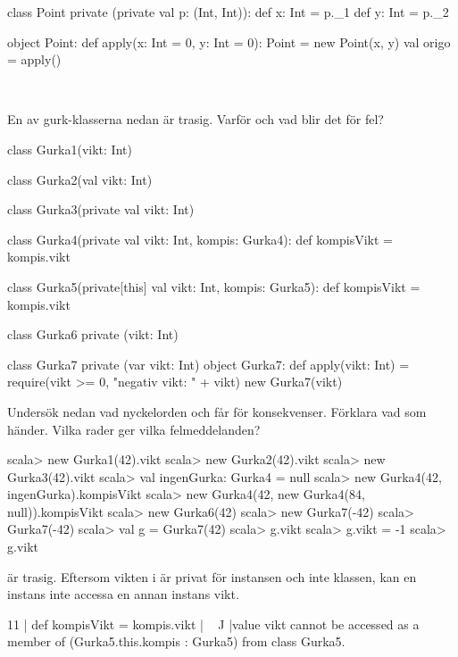 \SubtaskSolved

\begin{Code}
class Point private (private val p: (Int, Int)):
  def x: Int = p._1
  def y: Int = p._2

object Point:
  def apply(x: Int = 0, y: Int = 0): Point = new Point(x, y)
  val origo = apply()
\end{Code}

\QUESTEND




\QUESTBEGIN

\Task  \what~

\Subtask En av gurk-klasserna nedan är trasig. Varför och vad blir det för fel?

\begin{Code}
class Gurka1(vikt: Int)

class Gurka2(val vikt: Int)

class Gurka3(private val vikt: Int)

class Gurka4(private val vikt: Int, kompis: Gurka4):
  def kompisVikt = kompis.vikt

class Gurka5(private[this] val vikt: Int, kompis: Gurka5):
  def kompisVikt = kompis.vikt

class Gurka6 private (vikt: Int)

class Gurka7 private (var vikt: Int)
object Gurka7:
  def apply(vikt: Int) =
    require(vikt >= 0, "negativ vikt: " + vikt)
    new Gurka7(vikt)
\end{Code}

\Subtask Undersök nedan vad nyckelorden  och  får för konsekvenser. Förklara vad som händer. Vilka rader ger vilka felmeddelanden?

\begin{REPL}
scala> new Gurka1(42).vikt
scala> new Gurka2(42).vikt
scala> new Gurka3(42).vikt
scala> val ingenGurka: Gurka4 = null
scala> new Gurka4(42, ingenGurka).kompisVikt
scala> new Gurka4(42, new Gurka4(84, null)).kompisVikt
scala> new Gurka6(42)
scala> new Gurka7(-42)
scala> Gurka7(-42)
scala> val g = Gurka7(42)
scala> g.vikt
scala> g.vikt = -1
scala> g.vikt
\end{REPL}


\SOLUTION


\TaskSolved \what

\SubtaskSolved {} är trasig. Eftersom vikten i  är privat för instansen och inte klassen, kan en instans inte accessa en annan instans vikt.
\begin{REPL}
11 |  def kompisVikt = kompis.vikt
   |                   ^^^^^^^^^^^
   |value vikt cannot be accessed as a member of (Gurka5.this.kompis : Gurka5) from class Gurka5.
\end{REPL}


